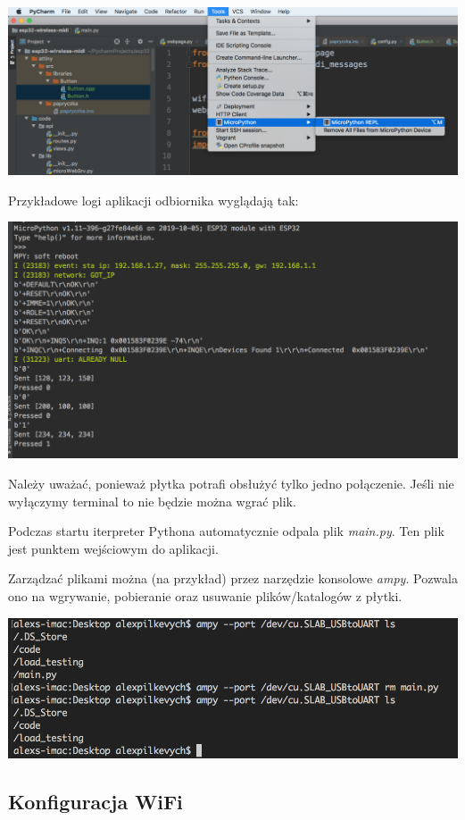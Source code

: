 \documentclass[eng,printmode]{mgr}
\begin{document}
\includegraphics[width=\textwidth]{pycharm}

Przykładowe logi aplikacji odbiornika wyglądają tak:

\includegraphics[width=\textwidth]{logs}

Należy uważać, ponieważ płytka potrafi obsłużyć tylko jedno połączenie. Jeśli nie wyłączymy terminal to nie będzie można wgrać plik.

Podczas startu iterpreter Pythona automatycznie odpala plik \textit{main.py}. Ten plik jest punktem wejściowym do aplikacji.

Zarządzać plikami można (na przykład) przez narzędzie konsolowe \textit{ampy}. Pozwala ono na wgrywanie, pobieranie oraz usuwanie plików/katalogów z płytki.

\includegraphics[width=\textwidth]{ampy}


\subsection{Konfiguracja WiFi}
\end{document}
